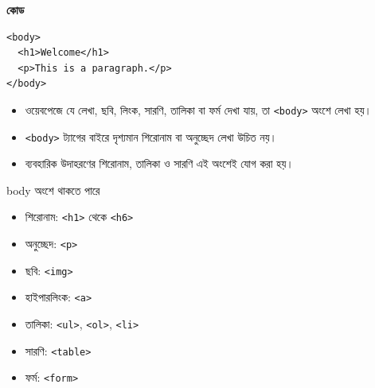 \par\noindent
\begin{minipage}[t]{.50\linewidth}\vspace{0pt}\small
\textbf{\color{chFourTeal}কোড}\par
\begin{verbatim}
<body>
  <h1>Welcome</h1>
  <p>This is a paragraph.</p>
</body>
\end{verbatim}

\par\smallskip
\end{minipage}\hfill
\begin{minipage}[t]{.46\linewidth}\vspace{0pt}\small
\begin{itemize}
\item ওয়েবপেজে যে লেখা, ছবি, লিংক, সারণি, তালিকা বা ফর্ম দেখা যায়, তা \texttt{<body>} অংশে লেখা হয়।
\item \texttt{<body>} ট্যাগের বাইরে দৃশ্যমান শিরোনাম বা অনুচ্ছেদ লেখা উচিত নয়।
\item ব্যবহারিক উদাহরণের শিরোনাম, তালিকা ও সারণি এই অংশেই যোগ করা হয়।
\end{itemize}
\end{minipage}\par


\begin{keypointbox}{body অংশে থাকতে পারে}
\par\noindent
\begin{minipage}[t]{.48\linewidth}\vspace{0pt}
\begin{itemize}
\item শিরোনাম: \texttt{<h1>} থেকে \texttt{<h6>}
\item অনুচ্ছেদ: \texttt{<p>}
\item ছবি: \texttt{<img>}
\item হাইপারলিংক: \texttt{<a>}
\end{itemize}
\end{minipage}\hfill
\begin{minipage}[t]{.48\linewidth}\vspace{0pt}
\begin{itemize}
\item তালিকা: \texttt{<ul>}, \texttt{<ol>}, \texttt{<li>}
\item সারণি: \texttt{<table>}
\item ফর্ম: \texttt{<form>}
\end{itemize}
\end{minipage}\par

\end{keypointbox}

